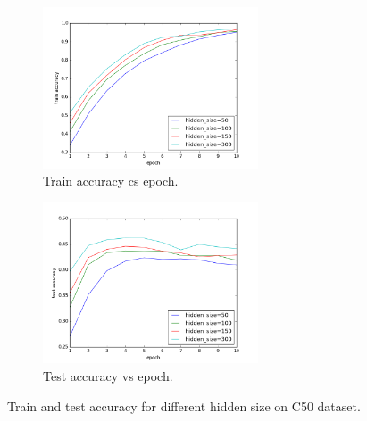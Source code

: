 \documentclass{article} %
\begin{document}
\begin{figure}[H]
\begin{subfigure}{0.5\linewidth}
\centering
\includegraphics[width=0.7\textwidth]{figures/epoch_train_accu_word_c50.png} 
\caption{Train accuracy cs epoch. }
\end{subfigure}
\begin{subfigure}{0.5\linewidth}
\centering
\includegraphics[width=0.7\textwidth]{figures/epoch_test_accu_word_c50.png} 
\caption{Test accuracy vs epoch.}
\end{subfigure}
\caption{Train and test accuracy for different hidden size on C50 dataset.}
\label{fig: word_c50}
\end{figure}
\end{document}
